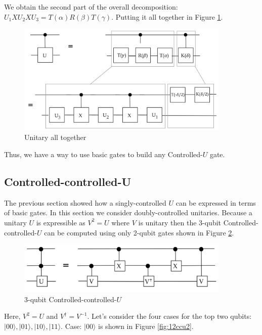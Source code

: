 \documentclass[main.tex]{subfiles}
\begin{document}
    We obtain the second part of the overall decomposition: $U_{1} X U_{2} X U_{3}=T(\alpha) R(\beta) T(\gamma)$. Putting it all together in Figure \ref{fig:10universal10}.
    
    \begin{figure}
        \centering
        \includegraphics[width=4in]{notes/figs/n09/10universal10.png}
        \caption{Unitary all together}
        \label{fig:10universal10}
    \end{figure}
    
    Thus, we have a way to use basic gates to build any Controlled-$U$ gate.

\subsection{Controlled-controlled-U}

    The previous section showed how a singly-controlled $U$ can be expressed in terms of basic gates. In this section we consider doubly-controlled unitaries. Because a unitary $U$ is expressible as $V^{2}=U$ where $V$ is unitary then the 3-qubit Controlled-controlled-$U$ can be computed using only 2-qubit gates shown in Figure \ref{fig:11ccu}.
    
    \begin{figure}
        \centering
        \includegraphics[width=4in]{notes/figs/n09/11ccu.png}
        \caption{3-qubit Controlled-controlled-$U$}
        \label{fig:11ccu}
    \end{figure}
    
    Here, $V^{2}=U$ and $V^{\dagger}=V^{-1}$. Let's consider the four cases for the top two qubits: $|00\rangle,|01\rangle,|10\rangle,|11\rangle$. Case: $|00\rangle$ is shown in Figure \ref{fig:12ccu2}.
    
\end{document}
